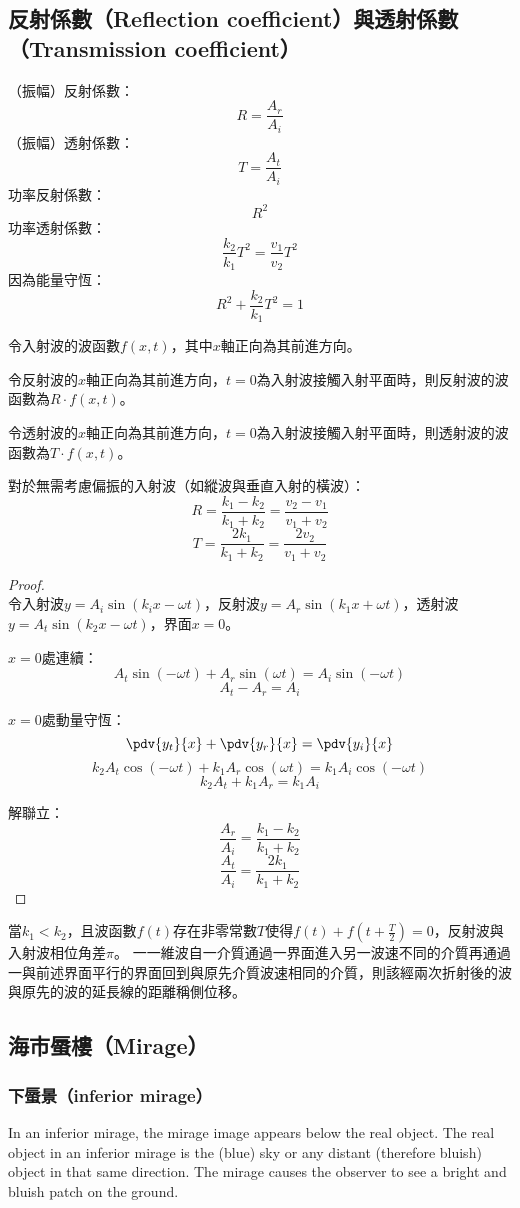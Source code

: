 \documentclass[a4paper,12pt]{report}
\begin{document}
\subsection{反射係數（Reflection coefficient）與透射係數（Transmission coefficient）}
（振幅）反射係數：
\[ R = \frac{A_r}{A_i} \]
（振幅）透射係數：
\[ T = \frac{A_t}{A_i} \]
功率反射係數：
\[ R^2 \]
功率透射係數：
\[ \frac{k_2}{k_1}T^2=\frac{v_1}{v_2}T^2\]
因為能量守恆：
\[ R^2 + \frac{k_2}{k_1}T^2 = 1 \]

令入射波的波函數$f(x,t)$，其中$x$軸正向為其前進方向。

令反射波的$x$軸正向為其前進方向，$t=0$為入射波接觸入射平面時，則反射波的波函數為$R\cdot f(x,t)$。

令透射波的$x$軸正向為其前進方向，$t=0$為入射波接觸入射平面時，則透射波的波函數為$T\cdot f(x,t)$。

對於無需考慮偏振的入射波（如縱波與垂直入射的橫波）：
\[ R = \frac{k_1-k_2}{k_1+k_2} = \frac{v_2-v_1}{v_1+v_2} \]
\[ T = \frac{2k_1}{k_1+k_2} = \frac{2v_2}{v_1+v_2} \]
\begin{proof}\mbox{}\\
令入射波$y=A_i\sin(k_ix-\omega t)$，反射波$y=A_r\sin(k_1x+\omega t)$，透射波$y=A_t\sin(k_2x-\omega t)$，界面$x=0$。

$x=0$處連續：
\[A_t\sin(-\omega t)+A_r\sin(\omega t)=A_i\sin(-\omega t)\]
\[A_t-A_r=A_i\]

$x=0$處動量守恆：
\[\pdv{y_t}{x}+\pdv{y_r}{x}=\pdv{y_i}{x}\]
\[k_2A_t\cos(-\omega t)+k_1A_r\cos(\omega t)=k_1A_i\cos(-\omega t)\]
\[k_2A_t+k_1A_r=k_1A_i\]

解聯立：
\[ \frac{A_r}{A_i} = \frac{k_1-k_2}{k_1+k_2} \]
\[ \frac{A_t}{A_i} = \frac{2k_1}{k_1+k_2} \]
\end{proof}
當$k_1<k_2$，且波函數$f(t)$存在非零常數$T$使得$f(t)+f(t+\frac{T}{2})=0$，反射波與入射波相位角差$\pi$。
一一維波自一介質通過一界面進入另一波速不同的介質再通過一與前述界面平行的界面回到與原先介質波速相同的介質，則該經兩次折射後的波與原先的波的延長線的距離稱側位移。
\subsection{海市蜃樓（Mirage）}
\subsubsection{下蜃景（inferior mirage）}
In an inferior mirage, the mirage image appears below the real object. The real object in an inferior mirage is the (blue) sky or any distant (therefore bluish) object in that same direction. The mirage causes the observer to see a bright and bluish patch on the ground.
\end{document}
